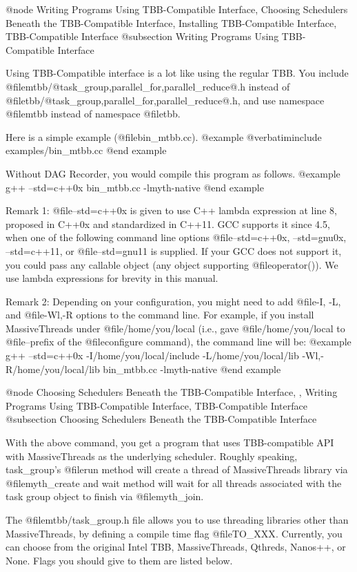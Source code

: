 @node Writing Programs Using TBB-Compatible Interface, Choosing Schedulers Beneath the TBB-Compatible Interface, Installing TBB-Compatible Interface, TBB-Compatible Interface
@subsection Writing Programs Using TBB-Compatible Interface

Using TBB-Compatible interface is a lot like using the regular TBB.  You
include @file{mtbb/@{task_group,parallel_for,parallel_reduce@}.h}
instead of @file{tbb/@{task_group,parallel_for,parallel_reduce@}.h}, and
use namespace @file{mtbb} instead of namespace @file{tbb}.

Here is a simple example (@file{bin_mtbb.cc}).
@example
@verbatiminclude examples/bin_mtbb.cc
@end example

Without DAG Recorder, you would compile this program as follows.
@example
g++ --std=c++0x bin_mtbb.cc -lmyth-native
@end example

Remark 1: @file{--std=c++0x} is given to use C++ lambda expression at
line 8, proposed in C++0x and standardized in C++11.  GCC supports it
since 4.5, when one of the following command line options
@file{--std=c++0x, --std=gnu0x, --std=c++11}, or @file{--std=gnu11} is
supplied.  If your GCC does not support it, you could pass any callable
object (any object supporting @file{operator()}).  We use lambda
expressions for brevity in this manual.

Remark 2: Depending on your configuration, you might need to add
@file{-I, -L,} and @file{-Wl,-R} options to the command line.  For
example, if you install MassiveThreads under @file{/home/you/local} (i.e.,
gave @file{/home/you/local} to @file{--prefix} of the @file{configure}
command), the command line will be:
@example
g++ --std=c++0x -I/home/you/local/include -L/home/you/local/lib -Wl,-R/home/you/local/lib bin_mtbb.cc -lmyth-native
@end example

@node Choosing Schedulers Beneath the TBB-Compatible Interface,  , Writing Programs Using TBB-Compatible Interface, TBB-Compatible Interface
@subsection Choosing Schedulers Beneath the TBB-Compatible Interface

With the above command, you get a program that uses TBB-compatible API
with MassiveThreads as the underlying scheduler.  Roughly speaking,
task_group's @file{run} method will create a thread of MassiveThreads
library via @file{myth_create} and wait method will wait for all threads
associated with the task group object to finish via @file{myth_join}.

The @file{mtbb/task_group.h} file allows you to use threading libraries other than MassiveThreads, by defining a compile time flag @file{TO_XXX}.  Currently, you can choose from the original Intel TBB, MassiveThreads, Qthreds, Nanos++, or None.  Flags you should give to them are listed below.

